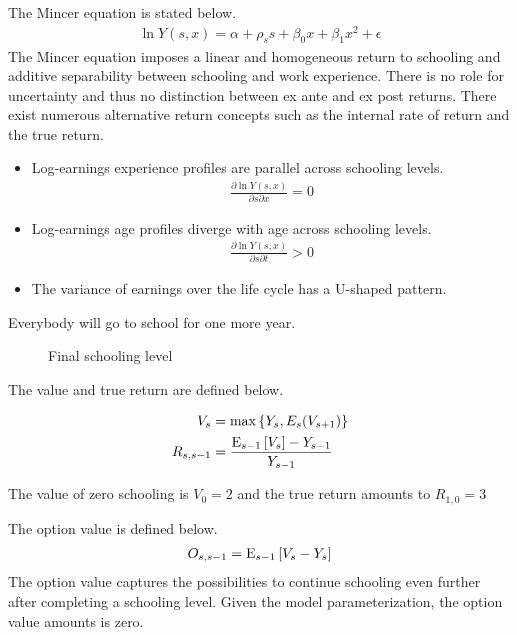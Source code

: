 \begin{boenumerate}

\item The Mincer equation is stated below.
%
\begin{align*}
\ln{Y(s, x)} = \alpha + \rho_s s + \beta_0 x + \beta_1 x^2 + \epsilon
\end{align*}
%
The Mincer equation imposes a linear and homogeneous return to schooling and additive separability between schooling and work experience. There is no role for uncertainty and thus no distinction between ex ante and ex post returns. There exist numerous alternative return concepts such as the internal rate of return and the true return.

\begin{itemize}
\item Log-earnings experience profiles are parallel across schooling levels.
\begin{align*}
\frac{\partial \ln{Y(s, x)}}{\partial s \partial x} = 0
\end{align*}
\item Log-earnings age profiles diverge with age across schooling levels.
\begin{align*}
\frac{\partial \ln{Y(s, x)}}{\partial s \partial t} > 0
\end{align*}
\item The variance of earnings over the life cycle has a U-shaped pattern.
\end{itemize}

\item Everybody will go to school for one more year.

\begin{figure}[htp]\centering
\caption{Final schooling level}\label{Final schooling level}
\end{figure}

\item The value and true return are defined below.

\begin{align*}
V_s & = \max\left\{Y_s, E_s(V_{s+1})\right\}\\
R_{s, s - 1} & = \frac{\mathrm{E}_{s - 1}\left[V_s\right] - Y_{s - 1}}{Y_{s -1}}
\end{align*}

The value of zero schooling is $V_0 = 2$ and the true return amounts to $R_{1, 0} = 3$

\item The option value is defined below.
%
\begin{align*}
O_{s, s - 1} = \mathrm{E}_{s - 1}\left[V_s - Y_s\right]
\end{align*}
%
The option value captures the possibilities to continue schooling even further after completing a schooling level. Given the model parameterization, the option value amounts is zero.
\end{boenumerate}
